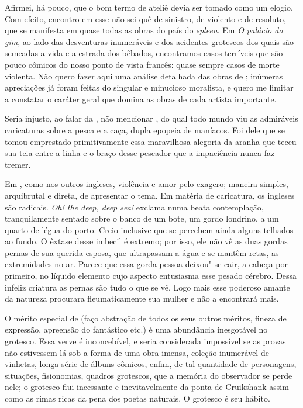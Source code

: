 Afirmei, há pouco, que o bom termo de ateliê devia ser tomado como um
elogio. Com efeito, encontro em  esse não sei quê de sinistro,
de violento e de resoluto, que se manifesta em quase todas as obras do
país do \textit{spleen}. Em \textit{O palácio do gim}, ao lado das
desventuras inumeráveis e dos acidentes grotescos dos quais são
semeadas a vida e a estrada dos bêbados, encontramos casos terríveis
que são pouco cômicos do nosso ponto de vista francês: quase sempre
casos de morte violenta. Não quero fazer aqui uma análise detalhada das
obras de ; inúmeras apreciações já foram feitas do singular e
minucioso moralista, e quero me limitar a constatar o caráter geral que
domina as obras de cada artista importante.

Seria injusto, ao falar da , não mencionar , do qual
todo mundo viu as admiráveis caricaturas sobre a pesca e a caça, dupla
epopeia de maníacos. Foi dele que se tomou emprestado primitivamente
essa maravilhosa alegoria da aranha que teceu sua teia entre a linha e
o braço desse pescador que a impaciência nunca faz tremer.

Em , como nos outros ingleses, violência e amor pelo exagero;
maneira simples, arquibrutal e direta, de apresentar o tema. Em matéria
de caricatura, os ingleses são radicais. \textit{Oh! the deep, deep
sea!} exclama numa beata contemplação, tranquilamente sentado sobre o
banco de um bote, um gordo londrino, a um quarto de légua do porto.
Creio inclusive que se percebem ainda alguns telhados ao fundo. O
êxtase desse imbecil é extremo; por isso, ele não vê as duas gordas
pernas de sua querida esposa, que ultrapassam a água e se mantêm retas,
as extremidades no ar. Parece que essa gorda pessoa deixou"-se cair, a
cabeça por primeiro, no líquido elemento cujo aspecto entusiasma esse
pesado cérebro. Dessa infeliz criatura as pernas são tudo o que se vê.
Logo mais esse poderoso amante da natureza procurara fleumaticamente
sua mulher e não a encontrará mais.

O mérito especial de  (faço abstração de todos os seus
outros méritos, fineza de expressão, apreensão do fantástico etc.) é
uma abundância inesgotável no grotesco. Essa verve é inconcebível, e
seria considerada impossível se as provas não estivessem lá sob a forma
de uma obra imensa, coleção inumerável de vinhetas, longa série de
álbuns cômicos, enfim, de tal quantidade de personagens, situações,
fisionomias, quadros grotescos, que a memória do observador se perde
nele; o grotesco flui incessante e inevitavelmente da ponta de
Cruikshank assim como as rimas ricas da pena dos poetas naturais. O
grotesco é seu hábito.

